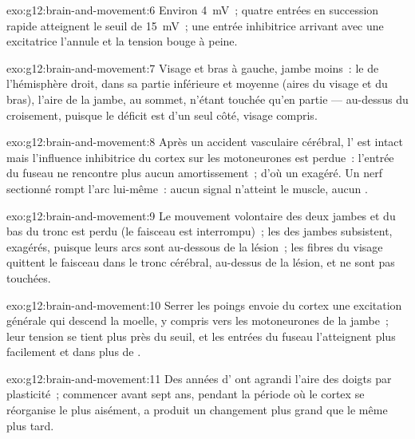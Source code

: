 \begin{solution}{exo:g12:brain-and-movement:6}
Environ \qty{4}{mV}~; quatre entrées en succession rapide atteignent
le seuil de \qty{15}{mV}~; une entrée inhibitrice arrivant avec une
excitatrice l'annule et la tension bouge à peine.
\end{solution}

\begin{solution}{exo:g12:brain-and-movement:7}
Visage et bras à gauche, jambe moins~: le  de
l'hémisphère droit, dans sa partie inférieure et moyenne (aires du
visage et du bras), l'aire de la jambe, au sommet, n'étant touchée
qu'en partie --- au-dessus du croisement, puisque le déficit est d'un
seul côté, visage compris.
\end{solution}

\begin{solution}{exo:g12:brain-and-movement:8}
Après un accident vasculaire cérébral, l' est intact mais
l'influence inhibitrice du cortex sur les motoneurones est perdue~:
l'entrée du fuseau ne rencontre plus aucun amortissement~; d'où un
 exagéré. Un nerf sectionné rompt l'arc lui-même~: aucun signal
n'atteint le muscle, aucun .
\end{solution}

\begin{solution}{exo:g12:brain-and-movement:9}
Le mouvement volontaire des deux jambes et du bas du tronc est perdu
(le faisceau est interrompu)~; les  des jambes subsistent,
exagérés, puisque leurs arcs sont au-dessous de la lésion~; les fibres
du visage quittent le faisceau dans le tronc cérébral, au-dessus de la
lésion, et ne sont pas touchées.
\end{solution}

\begin{solution}{exo:g12:brain-and-movement:10}
Serrer les poings envoie du cortex une excitation générale qui
descend la moelle, y compris vers les motoneurones de la jambe~; leur
tension se tient plus près du seuil, et les entrées du fuseau
l'atteignent plus facilement et dans plus de .
\end{solution}

\begin{solution}{exo:g12:brain-and-movement:11}
Des années d' ont agrandi l'aire des doigts par
plasticité~; commencer avant sept ans, pendant la période où le cortex
se réorganise le plus aisément, a produit un changement plus grand que
le même  plus tard.
\end{solution}

